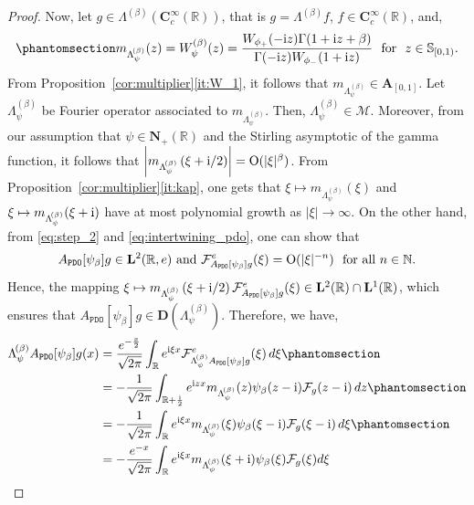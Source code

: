 \documentclass[12pt]{amsart}
\newcommand{\hlabel}{\phantomsection\label}
\numberwithin{equation}{section}
\newcommand{\bb}{\mathbb}
\newcommand{\cc}{\mathcal}
\newcommand{\ttt}{\mathtt}
\newcommand{\bmrm}[2][2]{\mathbf{#2}^{#1}}
\newcommand{\fou}{\mathcal{F}}
\newcommand{\WBpsi}{W^{(\beta)}_\psi}
\newcommand{\fouho}{\cc{F}^{e}}
\newcommand{\C}{\mathbf{C}}
\newcommand{\D}{\mathbf{D}}
\newcommand{\A}{\mathbf{A}}
\theoremstyle{definition}
\theoremstyle{assump}
\theoremstyle{remark}
\begin{document}
{\begin{proof}
\noindent
Now, let $g\in\Lambda^{\!(\beta)}(\C^\infty_c(\bb{R}))$, that is  $g=\Lambda^{\!(\beta)}f$, $f\in \C^\infty_c(\bb{R})$, and,
\begin{align}\hlabel{eq:W^beta_psi}
m_{\Lambda^{\!(\beta)}_\psi}(z)=\WBpsi(z)=\frac{W_{\phi_+}(-{\rm{i}}z   )\Gamma(1+{\rm{i}}z+\beta)}{\Gamma(-{\rm{i}}z   )W_{\phi_-}(1+{\rm{i}}z   )} \ \ \mbox{for} \ \  z\in\bb{S}_{[0,1)}.
\end{align}
From Proposition~\ref{cor:multiplier}\eqref{it:W_1}, it follows that $m_{\Lambda^{\!(\beta)}_\psi}\in\A_{[0,1]}$. Let $\Lambda^{\!(\beta)}_\psi$ be Fourier operator associated to $m_{\Lambda^{\!(\beta)}_\psi}$. Then, $\Lambda^{\!(\beta)}_\psi\in\mathscr{M}$. Moreover, from our assumption that $\psi\in\mathbf{N}_+(\bb{R})$ and the  Stirling asymptotic of the gamma function, it follows that $\left|m_{\Lambda^{\!(\beta)}_\psi}\left(\xi+{\rm{i}}/2\right)\right|={\rm{O}}(|\xi|^\beta)$. From Proposition~\ref{cor:multiplier}\eqref{it:kap}, one gets that
$\xi\mapsto m_{\Lambda^{\!(\beta)}_\psi}(\xi)$ and  $ \xi\mapsto m_{\Lambda^{\!(\beta)}_\psi}(\xi+{\rm{i}})   $ have at most polynomial growth as $|\xi|\to\infty$. On the other hand, from \eqref{eq:step_2} and \eqref{eq:intertwining_pdo}, one can show that
\begin{align*}
A_\ttt{PDO}[\psi_\beta]g\in\bmrm{L}(\bb{R},e)  \mbox{ and }  \fouho_{A_\ttt{PDO}[\psi_\beta]g}(\xi)={\rm{O}}(|\xi|^{-n}) \ \ \mbox{for all $n\in\bb{N}$}.
\end{align*}
Hence, the mapping $\xi\mapsto m_{\Lambda^{\!(\beta)}_\psi}\left(\xi+{\rm{i}}/2\right)\fouho_{A_\ttt{PDO}[\psi_\beta]g}(\xi)\in\bmrm{L}(\bb{R})\cap\bmrm[1]{L}(\bb{R})$,
which ensures that $A_\ttt{PDO}[\psi_\beta]g\in\D(\Lambda^{\!(\beta)}_\psi)$.
 Therefore, we have,
\begin{align}
\Lambda^{\!(\beta)}_\psi A_{\ttt{PDO}}[\psi_\beta]g(x)&=\frac{e^{-\frac{x}{2}}}{\sqrt{2\pi}}\int_{\bb{R}} e^{{\rm{i}}\xi   x}\fouho _{\Lambda^{\!(\beta)}_\psi A_\ttt{PDO}[\psi_\beta]g}(\xi)\,d\xi \hlabel{line1}\\
&=-\frac{1}{\sqrt{2\pi}}\int_{\bb{R}+\frac{{\rm{i}}}{2}} e^{{\rm{i}}z   x}m_{\Lambda^{\!(\beta)}_\psi}(z)\psi_\beta(z-{\rm{i}})   \fou_{g}(z-{\rm{i}})   \,dz \hlabel{line1'} \\
&=-\frac{1}{\sqrt{2\pi}}\int_{\bb{R}} e^{{\rm{i}}\xi   x}m_{\Lambda^{\!(\beta)}_\psi}(\xi)\psi_\beta(\xi-{\rm{i}})   \fou_{g}(\xi-{\rm{i}})   \,d\xi \hlabel{line2}\\
&=-\frac{e^{-x}}{\sqrt{2\pi}}\int_{\bb{R}}e^{{\rm{i}}\xi   x}m_{\Lambda^{\!(\beta)}_\psi}(\xi+{\rm{i}})   \psi_\beta(\xi)\fou_{g}(\xi)d\xi  \nonumber\\

\end{align}
\end{proof}}
\end{document}
